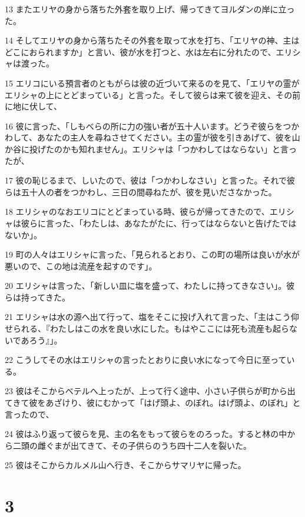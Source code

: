 \par 13 またエリヤの身から落ちた外套を取り上げ、帰ってきてヨルダンの岸に立った。
\par 14 そしてエリヤの身から落ちたその外套を取って水を打ち、「エリヤの神、主はどこにおられますか」と言い、彼が水を打つと、水は左右に分れたので、エリシャは渡った。
\par 15 エリコにいる預言者のともがらは彼の近づいて来るのを見て、「エリヤの霊がエリシャの上にとどまっている」と言った。そして彼らは来て彼を迎え、その前に地に伏して、
\par 16 彼に言った、「しもべらの所に力の強い者が五十人います。どうぞ彼らをつかわして、あなたの主人を尋ねさせてください。主の霊が彼を引きあげて、彼を山か谷に投げたのかも知れません」。エリシャは「つかわしてはならない」と言ったが、
\par 17 彼の恥じるまで、しいたので、彼は「つかわしなさい」と言った。それで彼らは五十人の者をつかわし、三日の間尋ねたが、彼を見いださなかった。
\par 18 エリシャのなおエリコにとどまっている時、彼らが帰ってきたので、エリシャは彼らに言った、「わたしは、あなたがたに、行ってはならないと告げたではないか」。
\par 19 町の人々はエリシャに言った、「見られるとおり、この町の場所は良いが水が悪いので、この地は流産を起すのです」。
\par 20 エリシャは言った、「新しい皿に塩を盛って、わたしに持ってきなさい」。彼らは持ってきた。
\par 21 エリシャは水の源へ出て行って、塩をそこに投げ入れて言った、「主はこう仰せられる、『わたしはこの水を良い水にした。もはやここには死も流産も起らないであろう』」。
\par 22 こうしてその水はエリシャの言ったとおりに良い水になって今日に至っている。
\par 23 彼はそこからベテルへ上ったが、上って行く途中、小さい子供らが町から出てきて彼をあざけり、彼にむかって「はげ頭よ、のぼれ。はげ頭よ、のぼれ」と言ったので、
\par 24 彼はふり返って彼らを見、主の名をもって彼らをのろった。すると林の中から二頭の雌ぐまが出てきて、その子供らのうち四十二人を裂いた。
\par 25 彼はそこからカルメル山へ行き、そこからサマリヤに帰った。

\chapter{3}


